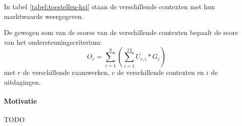 In tabel \ref{tabel:toestellen-hci} staan de verschillende contexten met hun marktwaarde weergegeven.

De gewogen som van de scores van de verschillende contexten bepaalt de score van het ondersteuningscriterium:
\begin{equation}
  O_r = \sum_{c=1}^{8}{\left(\sum_{i=1}^{13}U_{r,i}*G_c\right)}
  \label{eq:ondersteuning}
\end{equation}
met $r$ de verschillende raamwerken,  $c$ de verschillende contexten en $i$ de uitdagingen. 



\begin{table}[H]
\centering
{}
\caption{Beschikbare apparaten met hun besturingssysteem, browser en gewicht.}
\label{tabel:toestellen-hci}
\end{table}



\paragraph{Motivatie}
TODO


